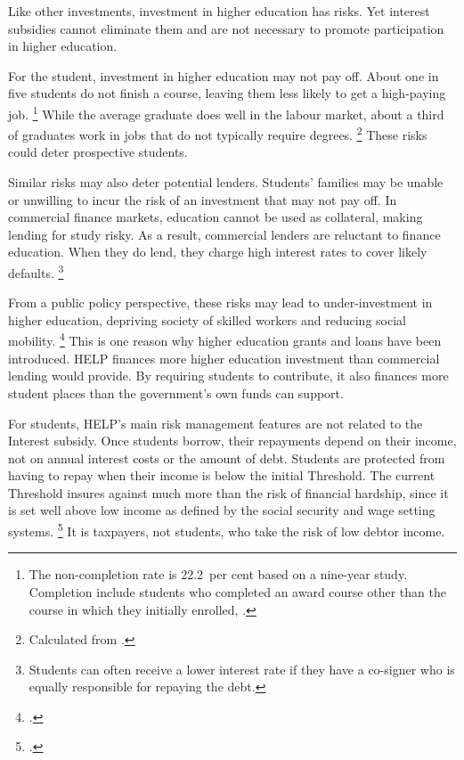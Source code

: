 \documentclass{grattan}
\begin{document}
Like other investments, investment in higher education has risks. Yet interest subsidies cannot eliminate them and are not necessary to promote participation in higher education.

For the student, investment in higher education may not pay off.
About one in five students do not finish a course, leaving them less likely to get a high-paying job.%
   \footnote{The non-completion rate is 22.2~per cent based on a nine-year study.
Completion include students who completed an award course other than the course in which they initially enrolled, \textcite{Education2015Completionratesdomestic}.} 
While the average graduate does well in the labour market, about a third of graduates work in jobs that do not typically require degrees.%
   \footnote{Calculated from \textcite[][Table~10]{ABS2015Educationwork2015}.} 
These risks could deter prospective students.

Similar risks may also deter potential lenders.
Students' families may be unable or unwilling to incur the risk of an investment that may not pay off.
In commercial finance markets, education cannot be used as collateral, making lending for study risky.
As a result, commercial lenders are reluctant to finance education.
When they do lend, they charge high interest rates to cover likely defaults.%
   \footnote{Students can often receive a lower interest rate if they have a co-signer who is equally responsible for repaying the debt.}

From a public policy perspective, these risks may lead to under-investment in higher education, depriving society of skilled workers and reducing social mobility.%
\footcite[][Section~2.5]{Chapman2006Governmentmanagingrisk} 
This is one reason why higher education grants and loans have been introduced.
\gls{HELP} finances more higher education investment than commercial lending would provide.
By requiring students to contribute, it also finances more student places than the government's own funds can support.

For students, \gls{HELP}'s main risk management features are not related to the \gls{Interest subsidy}.
Once students borrow, their repayments depend on their income, not on annual interest costs or the amount of debt.
Students are protected from having to repay when their income is below the initial \gls{Threshold}.
The current \gls{Threshold} insures against much more than the risk of financial hardship, since it is set well above low income as defined by the social security and wage setting systems.%
\footcite[][Chapter~4]{Norton2016HELPfuturefairer} 
It is taxpayers, not students, who take the risk of low debtor income.
\end{document}
